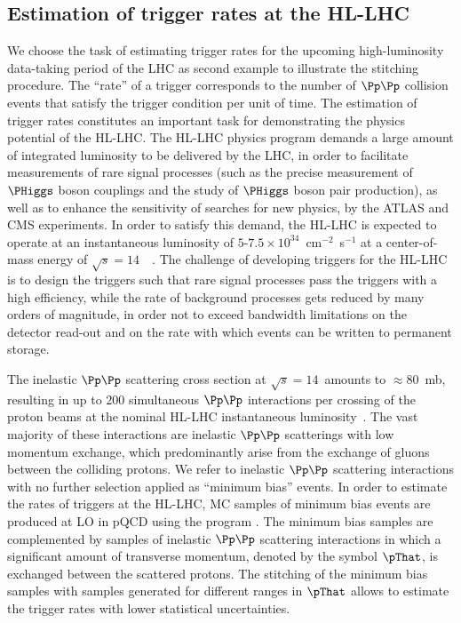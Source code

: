 \subsection{Estimation of trigger rates at the HL-LHC}
\label{sec:examples_trigger_rate}

We choose the task of estimating trigger rates for the upcoming high-luminosity data-taking period of the LHC as second example to illustrate the stitching procedure.
The ``rate'' of a trigger corresponds to the number of $\Pp\Pp$ collision events that satisfy the trigger condition per unit of time.
The estimation of trigger rates constitutes an important task for demonstrating the physics potential of the HL-LHC.
The HL-LHC physics program demands a large amount of integrated luminosity to be delivered by the LHC, 
in order to facilitate measurements of rare signal processes
(such as the precise measurement of $\PHiggs$ boson couplings and the study of $\PHiggs$ boson pair production),
as well as to enhance the sensitivity of searches for new physics, by the ATLAS and CMS experiments.
In order to satisfy this demand, the HL-LHC is expected to operate at an instantaneous luminosity of $5$-$7.5 \times 10^{34}$~cm$^{-2}$~s$^{-1}$
at a center-of-mass energy of $\sqrt{s} = 14$~\TeV~\cite{TDR_Phase2_LHC}.
The challenge of developing triggers for the HL-LHC is to design the triggers such that rare signal processes pass the triggers with a high efficiency,
while the rate of background processes gets reduced by many orders of magnitude, in order not to exceed bandwidth limitations on the detector read-out 
and on the rate with which events can be written to permanent storage.

The inelastic $\Pp\Pp$ scattering cross section at $\sqrt{s} = 14$~\TeV amounts to $\approx 80$~mb,
resulting in up to $200$ simultaneous $\Pp\Pp$ interactions per crossing of the proton beams at the nominal HL-LHC instantaneous luminosity~\cite{TDR_Phase2_LHC}.
The vast majority of these interactions are inelastic $\Pp\Pp$ scatterings with low momentum exchange,
which predominantly arise from the exchange of gluons between the colliding protons.
We refer to inelastic $\Pp\Pp$ scattering interactions with no further selection applied as ``minimum bias'' events.
In order to estimate the rates of triggers at the HL-LHC,
MC samples of minimum bias events are produced at LO in pQCD using the program \PYTHIA.
The minimum bias samples are complemented by samples of inelastic $\Pp\Pp$ scattering interactions
in which a significant amount of transverse momentum, denoted by the symbol $\pThat$, is exchanged between the scattered protons.
The stitching of the minimum bias samples with samples generated for different ranges in $\pThat$ allows to estimate the trigger rates with lower statistical uncertainties.

